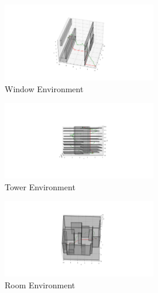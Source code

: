 \documentclass[conference]{IEEEtran}
\begin{document}
\begin{figure}[H]
    \centering
    \includegraphics[width=0.6\textwidth]{window_rrt.png}
    \caption{Window Environment}
    \label{fig:window_rrt}
\end{figure}
\begin{figure}[H]
    \centering
    \includegraphics[width=0.6\textwidth]{tower_rrt.png}
    \caption{Tower Environment}
    \label{fig:tower_rrt}
\end{figure}
\begin{figure}[H]
    \centering
    \includegraphics[width=0.6\textwidth]{room_rrt.png}
    \caption{Room Environment}
    \label{fig:room_rrt}
\end{figure}
\end{document}
